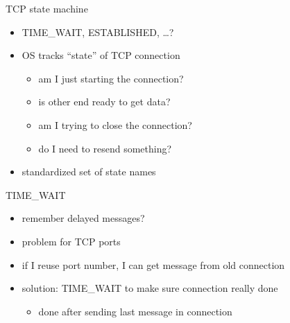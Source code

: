 \begin{frame}{TCP state machine}
\begin{itemize}
\item TIME\_WAIT, ESTABLISHED, \ldots?
\vspace{.5cm}
\item OS tracks ``state'' of TCP connection
    \begin{itemize}
    \item am I just starting the connection?
    \item is other end ready to get data?
    \item am I trying to close the connection?
    \item do I need to resend something?
    \end{itemize}
\item standardized set of state names
\end{itemize}
\end{frame}


\begin{frame}{TIME\_WAIT}
\begin{itemize}
\item remember delayed messages?
\vspace{.5cm}
\item problem for TCP ports
\item if I reuse port number, I can get message from old connection
\item solution: TIME\_WAIT to make sure connection really done
    \begin{itemize}
    \item done after sending last message in connection
    \end{itemize}
\end{itemize}
\end{frame}
